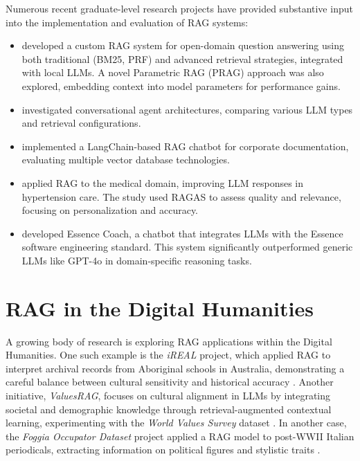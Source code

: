 \begin{spacing}{1.5}
Numerous recent graduate-level research projects have provided substantive input into the implementation and evaluation of RAG systems:
\begin{itemize}
    \item \textcite{antolini_experimental_2025} developed a custom RAG system for open-domain question answering using both traditional (BM25, PRF) and advanced retrieval strategies, integrated with local LLMs. A novel Parametric RAG (PRAG) approach was also explored, embedding context into model parameters for performance gains.
    \item \textcite{caramanna_progettazione_2024} investigated conversational agent architectures, comparing various LLM types and retrieval configurations.
    \item \textcite{florio_progettazione_2024} implemented a LangChain-based RAG chatbot for corporate documentation, evaluating multiple vector database technologies.
    \item \textcite{salcuni_utilizzo_2025} applied RAG to the medical domain, improving LLM responses in hypertension care. The study used RAGAS to assess quality and relevance, focusing on personalization and accuracy.
    \item \textcite{nicoletti_llms_2025} developed Essence Coach, a chatbot that integrates LLMs with the Essence software engineering standard. This system significantly outperformed generic LLMs like GPT-4o in domain-specific reasoning tasks.
\end{itemize}

\section{RAG in the Digital Humanities}
A growing body of research is exploring RAG applications within the Digital Humanities. One such example is the \textit{iREAL} project, which applied RAG to interpret archival records from Aboriginal schools in Australia, demonstrating a careful balance between cultural sensitivity and historical accuracy \citep{callaghan_prototyping_2025}. Another initiative, \textit{ValuesRAG}, focuses on cultural alignment in LLMs by integrating societal and demographic knowledge through retrieval-augmented contextual learning, experimenting with the \textit{World Values Survey} dataset \citep{seo_valuesrag_2025}. In another case, the \textit{Foggia Occupator Dataset} project applied a RAG model to post-WWII Italian periodicals, extracting information on political figures and stylistic traits \citep{ciletti_retrieval-augmented_2025}.


\end{spacing}
